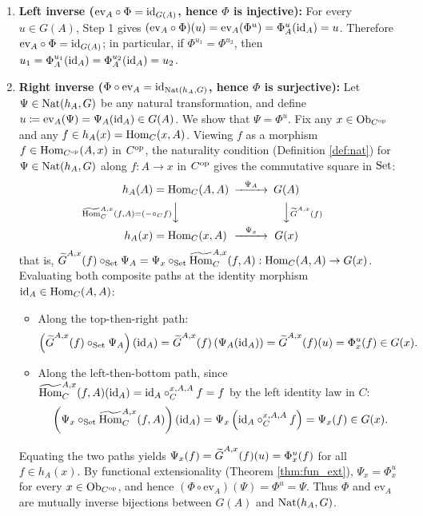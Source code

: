 \documentclass[10pt,a4paper]{article}
\begin{document}
\begin{enumerate}
\item \textbf{Left inverse ($\mathrm{ev}_A \circ \Phi = {\textrm{id}}_{G(A)}$, hence $\Phi$ is injective):}
For every $u \in G(A)$, Step 1 gives $(\mathrm{ev}_A \circ \Phi)(u) = \mathrm{ev}_A(\Phi^u) = \Phi^u_A({\textrm{id}}_A) = u$. Therefore $\mathrm{ev}_A \circ \Phi = {\textrm{id}}_{G(A)}$; in particular, if $\Phi^{u_1} = \Phi^{u_2}$, then $u_1 = \Phi^{u_1}_A({\textrm{id}}_A) = \Phi^{u_2}_A({\textrm{id}}_A) = u_2$.

\item \textbf{Right inverse ($\Phi \circ \mathrm{ev}_A = {\textrm{id}}_{{\textrm{Nat}}(h_A,G)}$, hence $\Phi$ is surjective):}
Let $\Psi \in {\textrm{Nat}}(h_A, G)$ be any natural transformation, and define $u \coloneqq \mathrm{ev}_A(\Psi) = \Psi_A({\textrm{id}}_A) \in G(A)$. We show that $\Psi = \Phi^u$.
Fix any $x \in {\textrm{Ob}}_{C^{\textrm{op}}}$ and any $f \in h_A(x) = {\textrm{Hom}}_C(x,A)$. Viewing $f$ as a morphism $f \in {\textrm{Hom}}_{C^{\textrm{op}}}(A,x)$ in $C^{\textrm{op}}$, the naturality condition (Definition \ref{def:nat}) for $\Psi \in {\textrm{Nat}}(h_A, G)$ along $f : A \to x$ in $C^{\textrm{op}}$ gives the commutative square in ${\textrm{Set}}$:
$$\begin{CD}
h_A(A) = \Hom_C(A,A) @>{\Psi_A}>> G(A) \\
@V{\HomMor_C^{A,x}(f,A) = (- \circ_C f)}VV @VV{\GMor^{A,x}(f)}V \\
h_A(x) = \Hom_C(x,A) @>{\Psi_x}>> G(x)
\end{CD}$$
that is, ${\widetilde{G}\textrm{}}^{A,x}(f) \circ_{\textrm{Set}} \Psi_A = \Psi_x \circ_{\textrm{Set}} {\widetilde{{\textrm{Hom}}}\textrm{}}_C^{A,x}(f,A) : {\textrm{Hom}}_C(A,A) \to G(x)$.
Evaluating both composite paths at the identity morphism ${\textrm{id}}_A \in {\textrm{Hom}}_C(A,A)$:
\begin{itemize}
\item Along the top-then-right path:
$$\left({\widetilde{G}\textrm{}}^{A,x}(f) \circ_{\textrm{Set}} \Psi_A\right)({\textrm{id}}_A) = {\widetilde{G}\textrm{}}^{A,x}(f)\left(\Psi_A({\textrm{id}}_A)\right) = {\widetilde{G}\textrm{}}^{A,x}(f)(u) = \Phi^u_x(f) \in G(x).$$
\item Along the left-then-bottom path, since ${\widetilde{{\textrm{Hom}}}\textrm{}}_C^{A,x}(f,A)({\textrm{id}}_A) = {\textrm{id}}_A \circ_C^{x,A,A} f = f$ by the left identity law in $C$:
$$\left(\Psi_x \circ_{\textrm{Set}} {\widetilde{{\textrm{Hom}}}\textrm{}}_C^{A,x}(f,A)\right)({\textrm{id}}_A) = \Psi_x\left({\textrm{id}}_A \circ_C^{x,A,A} f\right) = \Psi_x(f) \in G(x).$$
\end{itemize}
Equating the two paths yields $\Psi_x(f) = {\widetilde{G}\textrm{}}^{A,x}(f)(u) = \Phi^u_x(f)$ for all $f \in h_A(x)$.
By functional extensionality (Theorem \ref{thm:fun_ext}), $\Psi_x = \Phi^u_x$ for every $x \in {\textrm{Ob}}_{C^{\textrm{op}}}$, and hence $(\Phi \circ \mathrm{ev}_A)(\Psi) = \Phi^u = \Psi$. Thus $\Phi$ and $\mathrm{ev}_A$ are mutually inverse bijections between $G(A)$ and ${\textrm{Nat}}(h_A, G)$.
\end{enumerate}
\myqed
\end{document}
